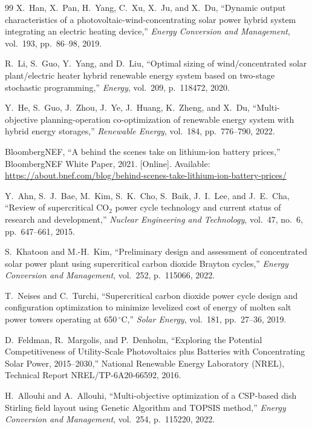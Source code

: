 \documentclass[journal]{IEEEtran}
\begin{document}
\begin{thebibliography}{99}
X.\ Han, X.\ Pan, H.\ Yang, C.\ Xu, X.\ Ju, and X.\ Du, ``Dynamic output characteristics of a photovoltaic-wind-concentrating solar power hybrid system integrating an electric heating device,'' \textit{Energy Conversion and Management}, vol.\ 193, pp.\ 86--98, 2019.

R.\ Li, S.\ Guo, Y.\ Yang, and D.\ Liu, ``Optimal sizing of wind/concentrated solar plant/electric heater hybrid renewable energy system based on two-stage stochastic programming,'' \textit{Energy}, vol.\ 209, p.\ 118472, 2020.

Y.\ He, S.\ Guo, J.\ Zhou, J.\ Ye, J.\ Huang, K.\ Zheng, and X.\ Du, ``Multi-objective planning-operation co-optimization of renewable energy system with hybrid energy storages,'' \textit{Renewable Energy}, vol.\ 184, pp.\ 776--790, 2022.

BloombergNEF, ``A behind the scenes take on lithium-ion battery prices,'' BloombergNEF White Paper, 2021. [Online]. Available: \url{https://about.bnef.com/blog/behind-scenes-take-lithium-ion-battery-prices/}

Y.\ Ahn, S.\ J.\ Bae, M.\ Kim, S.\ K.\ Cho, S.\ Baik, J.\ I.\ Lee, and J.\ E.\ Cha, ``Review of supercritical CO$_2$ power cycle technology and current status of research and development,'' \textit{Nuclear Engineering and Technology}, vol.\ 47, no.\ 6, pp.\ 647--661, 2015.

S.\ Khatoon and M.-H.\ Kim, ``Preliminary design and assessment of concentrated solar power plant using supercritical carbon dioxide Brayton cycles,'' \textit{Energy Conversion and Management}, vol.\ 252, p.\ 115066, 2022.

T.\ Neises and C.\ Turchi, ``Supercritical carbon dioxide power cycle design and configuration optimization to minimize levelized cost of energy of molten salt power towers operating at 650\,$^\circ$C,'' \textit{Solar Energy}, vol.\ 181, pp.\ 27--36, 2019.

D.\ Feldman, R.\ Margolis, and P.\ Denholm, ``Exploring the Potential Competitiveness of Utility-Scale Photovoltaics plus Batteries with Concentrating Solar Power, 2015--2030,'' National Renewable Energy Laboratory (NREL), Technical Report NREL/TP-6A20-66592, 2016.

H.\ Allouhi and A.\ Allouhi, ``Multi-objective optimization of a CSP-based dish Stirling field layout using Genetic Algorithm and TOPSIS method,'' \textit{Energy Conversion and Management}, vol.\ 254, p.\ 115220, 2022.


\end{thebibliography}
\end{document}

